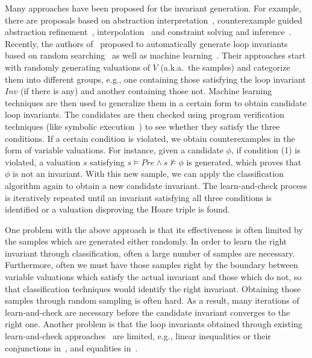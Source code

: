 Many approaches have been proposed for the invariant generation.
For example, there are proposals based on abstraction interpretation~\cite{cousot1978automatic,mine2006octagon,cousot1979systematic,karr1976affine,vincent2009subpolyhedra}, counterexample guided abstraction refinement~\cite{henzinger2003software,thomas2001slam,edmund2003counterexample}, interpolation~\cite{kenneth2010lazy,thomas2004abstractions,kenneth2003interpolation,Kenneth2006lazy} and constraint solving and inference~\cite{ashutosh2009invgen,michael2003linear,sumit2009constraint}.
Recently, the authors of~\cite{sharma2012interpolants,sharma2013verification,DBLP:conf/esop/0001GHALN13,sharma2014invariant} proposed to automatically generate loop invariants based on random searching~\cite{sharma2014invariant} as well as machine learning~\cite{sharma2012interpolants}.
Their approaches start with randomly generating valuations of $V$ (a.k.a.~the samples) and categorize them into different groups, e.g., one containing those satisfying the loop invariant $\mathit{Inv}$ (if there is any) and another containing those not. Machine learning techniques are then used to generalize them in a certain form to obtain candidate loop invariants.
The candidates are then checked using program verification techniques (like symbolic execution~\cite{symbolic}) to see whether they satisfy the three conditions. If a certain condition is violated, we obtain counterexamples in the form of variable valuations.
For instance, given a candidate $\phi$, if condition (1) is violated, a valuation $s$ satisfying $s {\models} Pre {\land} s {\not \models} \phi$ is generated, which proves that $\phi$ is not an invariant.
With this new sample, we can apply the classification algorithm again to obtain a new candidate invariant. The learn-and-check process is iteratively repeated until an invariant satisfying all three conditions is identified or a valuation disproving the Hoare triple is found.

One problem with the above approach is that its effectiveness is often limited by the samples which are generated either randomly. In order to learn the right invariant through classification, often a large number of samples are necessary. Furthermore, often we must have those samples right by the boundary between variable valuations which satisfy the actual invariant and those which do not, so that classification techniques would identify the right invariant. Obtaining those samples through random sampling is often hard. As a result, many iterations of learn-and-check are necessary before the candidate invariant converges to the right one. Another problem is that the loop invariants obtained through existing learn-and-check approaches~\cite{sharma2012interpolants,sharma2013verification,DBLP:conf/esop/0001GHALN13,sharma2014invariant} are limited, e.g., linear inequalities or their conjunctions in~\cite{sharma2012interpolants}, and equalities in~\cite{DBLP:conf/esop/0001GHALN13}.

